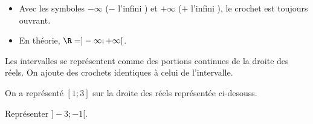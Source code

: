 \documentclass{article}
\begin{document}
\begin{remark}
\hfill

\begin{itemize}
\item Avec les symboles $- \infty$ (\og $-$ l'infini \fg) et $+ \infty$ (\og $+$ l'infini \fg), le crochet est toujours ouvrant.
\item En théorie, $\R = ]-\infty; +\infty[$.
\end{itemize}
\end{remark}
\begin{remark}
Les intervalles se représentent comme des portions continues de la droite des réels. On ajoute des crochets identiques à celui de l'intervalle.

On a représenté $[1;3]$ sur la droite des réels représentée ci-desouss. 

Représenter $]-3;-1[$.
\begin{center}
\end{center}
\end{remark}
\end{document}
